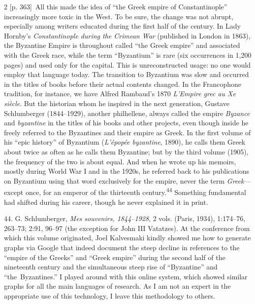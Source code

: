 \documentclass[10pt,a4paper]{article}
\begin{document}
\begin{paracol}{2}
\switchcolumn
{\scriptsize\color{gray}[p. 363]}\ All this made the idea of “the Greek empire of Constantinople” increasingly more toxic in the West. To be sure, the change was not abrupt, especially among writers educated during the first half of the century. In Lady Hornby’s \textit{Constantinople during the Crimean War} (published in London in 1863), the Byzantine Empire is throughout called “the Greek empire” and associated with the Greek race, while the term “Byzantium” is rare (six occurrences in 1,200 pages) and used only for the capital. This is unreconstructed usage: no one would employ that language today. The transition to Byzantium was slow and occurred in the titles of books before their actual contents changed. In the Francophone tradition, for instance, we have Alfred Rambaud’s 1870 \textit{L’Empire grec au Xe siècle}. But the historian whom he inspired in the next generation, Gustave Schlumberger (1844–1929), another philhellene, always called the empire \textit{Byzance} and \textit{byzantine} in the titles of his books and other projects, even though inside he freely referred to the Byzantines and their empire as Greek. In the first volume of his “epic history” of Byzantium (\textit{L’épopée byzantine}, 1890), he calls them Greek about twice as often as he calls them Byzantine; but by the third volume (1905), the frequency of the two is about equal. And when he wrote up his memoirs, mostly during World War I and in the 1920s, he referred back to his publications on Byzantium using that word exclusively for the empire, never the term \textit{Greek}—except once, for an emperor of the thirteenth century.\nobreak\textsuperscript{44} Something fundamental had shifted during his career, though he never explained it in print.\par{\small 44. G. Schlumberger, \textit{Mes souvenirs, 1844–1928}, 2 vols. (Paris, 1934), 1:174–76, 263–73; 2:91, 96–97 (the exception for John III Vatatzes). At the conference from which this volume originated, Joel Kalvesmaki kindly showed me how to generate graphs via Google that indeed document the steep decline in references to the “empire of the Greeks” and “Greek empire” during the second half of the nineteenth century and the simultaneous steep rise of “Byzantine” and “the Byzantines.” I played around with this online system, which showed similar graphs for all the main languages of research. As I am not an expert in the appropriate use of this technology, I leave this methodology to others.\par}
\switchcolumn*

\end{paracol}
\end{document}
